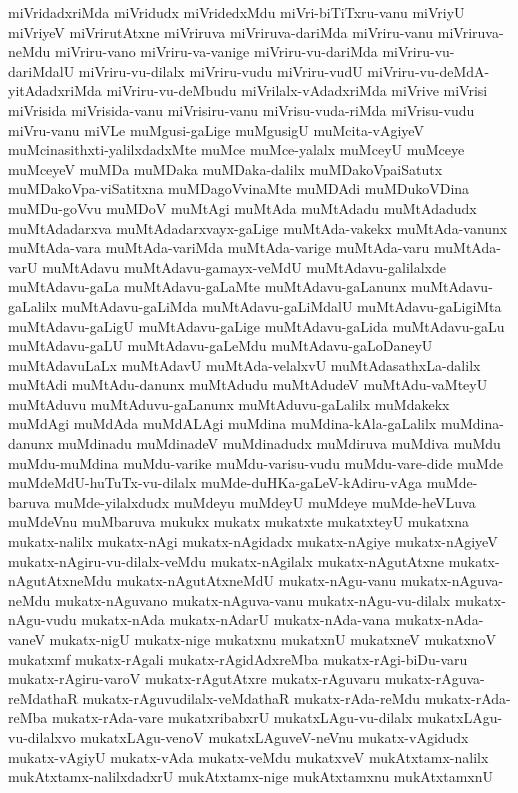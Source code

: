 {miVridadxriMda
miVridudx
miVridedxMdu
miVri-biTiTxru-vanu
miVriyU
miVriyeV
miVrirutAtxne
miVriruva
miVriruva-dariMda
miVriru-vanu
miVriruva-neMdu
miVriru-vano
miVriru-va-vanige
miVriru-vu-dariMda
miVriru-vu-dariMdalU
miVriru-vu-dilalx
miVriru-vudu
miVriru-vudU
miVriru-vu-deMdA-yitAdadxriMda
miVriru-vu-deMbudu
miVrilalx-vAdadxriMda
miVrive
miVrisi
miVrisida
miVrisida-vanu
miVrisiru-vanu
miVrisu-vuda-riMda
miVrisu-vudu
miVru-vanu
miVLe
muMgusi-gaLige
muMgusigU
muMcita-vAgiyeV
muMcinasithxti-yalilxdadxMte
muMce
muMce-yalalx
muMceyU
muMceye
muMceyeV
muMDa
muMDaka
muMDaka-dalilx
muMDakoVpaiSatutx
muMDakoVpa-viSatitxna
muMDagoVvinaMte
muMDAdi
muMDukoVDina
muMDu-goVvu
muMDoV
muMtAgi
muMtAda
muMtAdadu
muMtAdadudx
muMtAdadarxva
muMtAdadarxvayx-gaLige
muMtAda-vakekx
muMtAda-vanunx
muMtAda-vara
muMtAda-variMda
muMtAda-varige
muMtAda-varu
muMtAda-varU
muMtAdavu
muMtAdavu-gamayx-veMdU
muMtAdavu-galilalxde
muMtAdavu-gaLa
muMtAdavu-gaLaMte
muMtAdavu-gaLanunx
muMtAdavu-gaLalilx
muMtAdavu-gaLiMda
muMtAdavu-gaLiMdalU
muMtAdavu-gaLigiMta
muMtAdavu-gaLigU
muMtAdavu-gaLige
muMtAdavu-gaLida
muMtAdavu-gaLu
muMtAdavu-gaLU
muMtAdavu-gaLeMdu
muMtAdavu-gaLoDaneyU
muMtAdavuLaLx
muMtAdavU
muMtAda-velalxvU
muMtAdasathxLa-dalilx
muMtAdi
muMtAdu-danunx
muMtAdudu
muMtAdudeV
muMtAdu-vaMteyU
muMtAduvu
muMtAduvu-gaLanunx
muMtAduvu-gaLalilx
muMdakekx
muMdAgi
muMdAda
muMdALAgi
muMdina
muMdina-kAla-gaLalilx
muMdina-danunx
muMdinadu
muMdinadeV
muMdinadudx
muMdiruva
muMdiva
muMdu
muMdu-muMdina
muMdu-varike
muMdu-varisu-vudu
muMdu-vare-dide
muMde
muMdeMdU-huTuTx-vu-dilalx
muMde-duHKa-gaLeV-kAdiru-vAga
muMde-baruva
muMde-yilalxdudx
muMdeyu
muMdeyU
muMdeye
muMde-heVLuva
muMdeVnu
muMbaruva
mukukx
mukatx
mukatxte
mukatxteyU
mukatxna
mukatx-nalilx
mukatx-nAgi
mukatx-nAgidadx
mukatx-nAgiye
mukatx-nAgiyeV
mukatx-nAgiru-vu-dilalx-veMdu
mukatx-nAgilalx
mukatx-nAgutAtxne
mukatx-nAgutAtxneMdu
mukatx-nAgutAtxneMdU
mukatx-nAgu-vanu
mukatx-nAguva-neMdu
mukatx-nAguvano
mukatx-nAguva-vanu
mukatx-nAgu-vu-dilalx
mukatx-nAgu-vudu
mukatx-nAda
mukatx-nAdarU
mukatx-nAda-vana
mukatx-nAda-vaneV
mukatx-nigU
mukatx-nige
mukatxnu
mukatxnU
mukatxneV
mukatxnoV
mukatxmf
mukatx-rAgali
mukatx-rAgidAdxreMba
mukatx-rAgi-biDu-varu
mukatx-rAgiru-varoV
mukatx-rAgutAtxre
mukatx-rAguvaru
mukatx-rAguva-reMdathaR
mukatx-rAguvudilalx-veMdathaR
mukatx-rAda-reMdu
mukatx-rAda-reMba
mukatx-rAda-vare
mukatxribabxrU
mukatxLAgu-vu-dilalx
mukatxLAgu-vu-dilalxvo
mukatxLAgu-venoV
mukatxLAguveV-neVnu
mukatx-vAgidudx
mukatx-vAgiyU
mukatx-vAda
mukatx-veMdu
mukatxveV
mukAtxtamx-nalilx
mukAtxtamx-nalilxdadxrU
mukAtxtamx-nige
mukAtxtamxnu
mukAtxtamxnU
}
